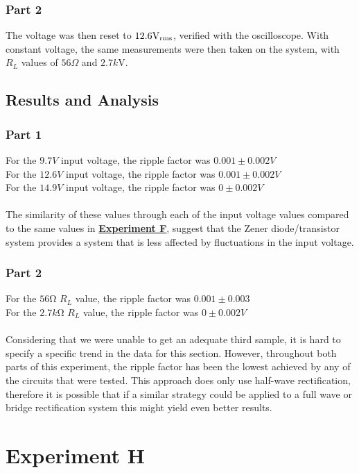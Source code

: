 \documentclass[
	letterpaper
	12pt
]{template}
\newcommand{\bref}[2]{\textbf{\hyperref[#1]{#2}}}
\begin{document}
\subsubsection{Part 2}\label{method::G2}
The voltage was then reset to $12.6\unit{\volt}_{\rm rms}$, verified with the oscilloscope. With constant voltage, the same measurements were then taken on the system, with $R_L$ values of $56\Omega$ and $2.7\unit{k\volt}$.
\subsection{Results and Analysis}
\subsubsection{Part 1}

For the $9.7\unit{V}$ input voltage, the ripple factor was $0.001\pm 0.002\unit{V}$\\
For the $12.6\unit{V}$ input voltage, the ripple factor was $0.001\pm 0.002\unit{V}$\\
For the $14.9\unit{V}$ input voltage, the ripple factor was $0\pm 0.002\unit{V}$\\\\
The similarity of these values through each of the input voltage values compared to the same values in \bref{exp::F}{Experiment F}, suggest that the Zener diode/transistor system provides a system that is less affected by fluctuations in the input voltage.
\subsubsection{Part 2}

For the $56\unit{\ohm}$ $R_L$ value, the ripple factor was $0.001\pm0.003$\\
For the $2.7\unit{k\ohm}$ $R_L$ value, the ripple factor was $0\pm 0.002\unit{V}$\\\\
Considering that we were unable to get an adequate third sample, it is hard to specify a specific trend in the data for this section. However, throughout both parts of this experiment, the ripple factor has been the lowest achieved by any of the circuits that were tested. This approach does only use half-wave rectification, therefore it is possible that if a similar strategy could be applied to a full wave or bridge rectification system this might yield even better results.




\section{Experiment H}\label{exp::H}
\end{document}
